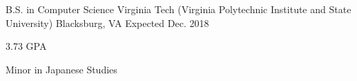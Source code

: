 

\begin{cventries}

  \cventry
    {B.S. in Computer Science} %
    {Virginia Tech (Virginia Polytechnic Institute and State University)} %
    {Blacksburg, VA} %
    {Expected Dec. 2018} %
    {
      \begin{cvitems} %
        \item {3.73 GPA}
        \item {Minor in Japanese Studies}
      \end{cvitems}
    }

\end{cventries}
